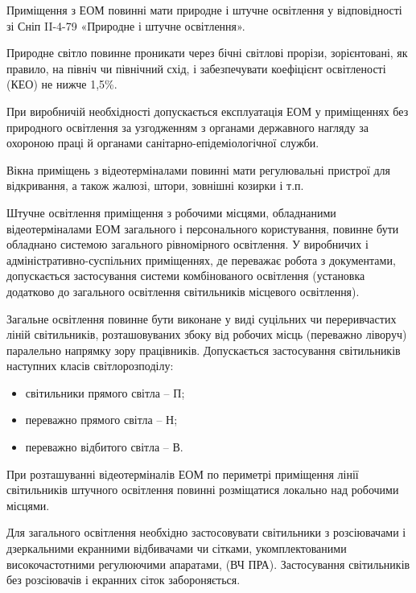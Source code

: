 \documentclass[simple,a4paper,14pt,ukrainian,utf8]{eskdtext}
\begin{document}
\begin{appendices}
                Приміщення з ЕОМ повинні мати природне і штучне освітлення у відповідності зі Сніп II-4-79 «Природне і штучне освітлення».

                Природне світло повинне проникати через бічні світлові прорізи, зорієнтовані, як правило, на північ чи північний схід, і забезпечувати коефіцієнт освітленості (КЕО) не нижче 1,5\%.

                При виробничій необхідності допускається експлуатація ЕОМ у приміщеннях без природного освітлення за узгодженням з органами державного нагляду за охороною праці й органами санітарно-епідеміологічної служби.

                Вікна приміщень з відеотерміналами повинні мати регулювальні пристрої для відкривання, а також жалюзі,  штори, зовнішні козирки і т.п.

                Штучне освітлення приміщення з робочими місцями, обладнаними відеотерміналами ЕОМ загального і персонального користування, повинне бути обладнано системою загального рівномірного освітлення. У виробничих і адміністративно-суспільних приміщеннях, де переважає робота з документами, допускається застосування системи комбінованого освітлення (установка додатково до загального освітлення світильників місцевого освітлення).

                Загальне освітлення повинне бути виконане у виді суцільних чи переривчастих ліній світильників, розташовуваних збоку від робочих місць (переважно ліворуч) паралельно напрямку зору працівників. Допускається застосування світильників наступних класів світлорозподілу:

                \begin{itemize}
                    \item світильники прямого світла -- П;
                    \item переважно прямого світла -- Н;
                    \item переважно відбитого світла -- В.
                \end{itemize}

                При розташуванні відеотерміналів ЕОМ по периметрі приміщення лінії світильників штучного освітлення повинні розміщатися локально над робочими місцями.

                Для загального освітлення необхідно застосовувати світильники з розсіювачами і дзеркальними екранними відбивачами чи сітками, укомплектованими високочастотними регулюючими апаратами, (ВЧ ПРА). Застосування світильників без розсіювачів і екранних сіток забороняється.


\end{appendices}
\end{document}
